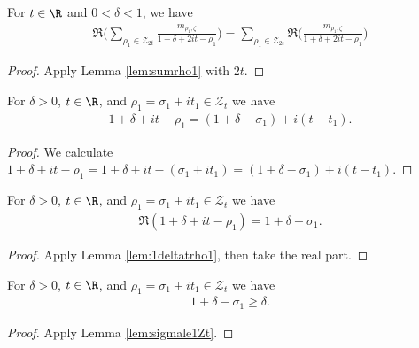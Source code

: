 \begin{lemma}\label{lem:sumrho2}  \leanok
For $t\in\R$ and $0<\delta<1$, we have
\begin{align*}
\Re\Big(\sum_{\rho_1\in \mathcal Z_{2t}} \frac{m_{\rho_1,\zeta}}{1+\delta+2it-\rho_1}\Big) = \sum_{\rho_1\in \mathcal Z_{2t}} \Re\Big(\frac{m_{\rho_1,\zeta}}{1+\delta+2it-\rho_1}\Big)
\end{align*}
\end{lemma}
\begin{proof}  \leanok
Apply Lemma \ref{lem:sumrho1} with $2t$.
\end{proof}

\begin{lemma}\label{lem:1deltatrho1}  \leanok
For $\delta>0$, $t\in\R$, and $\rho_1=\sigma_1+it_1\in \mathcal Z_t$ we have
\begin{align*}
1+\delta+it-\rho_1 = (1 + \delta -\sigma_1) + i(t-t_1).
\end{align*}
\end{lemma}
\begin{proof} \leanok
We calculate $1+\delta+it-\rho_1 = 1+\delta+it - (\sigma_1+it_1) = (1 + \delta -\sigma_1) + i(t-t_1)$.
\end{proof}

\begin{lemma}\label{lem:Re1deltatrho1}  \leanok
For $\delta>0$, $t\in\R$, and $\rho_1=\sigma_1+it_1\in \mathcal Z_t$ we have
\begin{align*}
\Re(1+\delta+it-\rho_1) = 1 + \delta -\sigma_1.
\end{align*}
\end{lemma}
\begin{proof} \leanok {}
Apply Lemma \ref{lem:1deltatrho1}, then take the real part.
\end{proof}

\begin{lemma}\label{lem:Re1delta1}  \leanok
For $\delta>0$, $t\in\R$, and $\rho_1=\sigma_1+it_1\in \mathcal Z_t$ we have
\begin{align*}
1 + \delta -\sigma_1 \ge \delta.
\end{align*}
\end{lemma}
\begin{proof} \leanok {}
Apply Lemma \ref{lem:sigmale1Zt}.
\end{proof}


